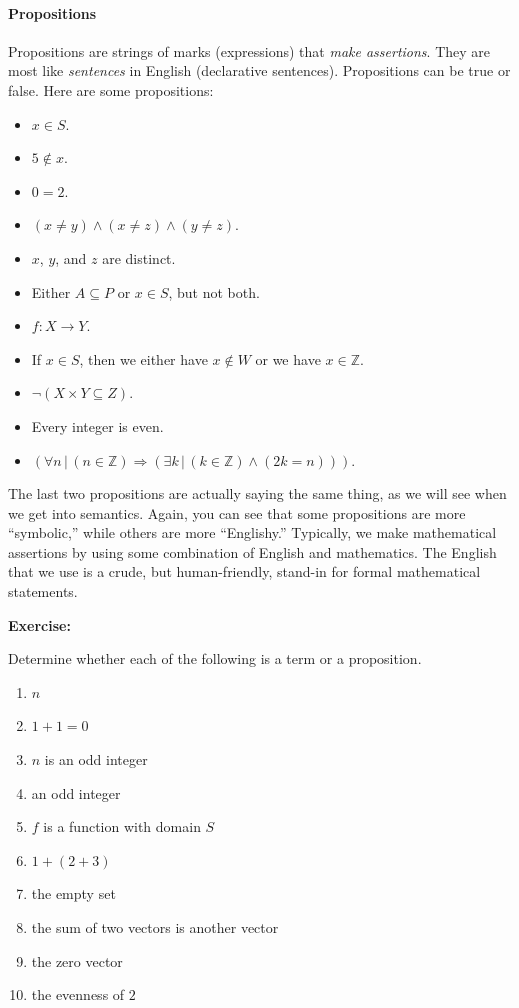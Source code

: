 \documentclass[12pt]{article}
\def\Z{\mathbb{Z}}
\newcommand{\AND}{\wedge}
\newcommand{\ARR}{\Rightarrow}
\newcommand{\ex}[1]{\textbf{Exercise:}\begin{adjustwidth}{2em}{}#1\end{adjustwidth}}
\begin{document}
\def\sp{\hspace{1em}}
\paragraph{Propositions}
Propositions are strings of marks (expressions) that \emph{make assertions}.
They are most like \emph{sentences} in English (declarative sentences).
Propositions can be true or false. 
Here are some propositions:
\begin{itemize}[label=\sp]
\item $x\in S$.
\item $5\notin x$.
\item $0=2$.
\item $(x\neq y) \AND (x\neq z) \AND (y\neq z)$.
\item $x$, $y$, and $z$ are distinct.
\item Either $A\subseteq P$ or $x\in S$, but not both.
\item $f:X\rightarrow Y$.
\item If $x\in S$, then we either have $x\notin W$ or we have $x\in\Z$.
\item $\neg(X\times Y \subseteq Z)$.
\item Every integer is even.
\item $(\forall n \, | \, (n\in\Z)\ARR (\exists k\,|\,(k\in\Z)\AND(2k=n)))$.
\end{itemize}
The last two propositions are actually saying the same thing, as we will see when we get into semantics.
Again, you can see that some propositions are more ``symbolic,'' while others are more ``Englishy.''
Typically, we make mathematical assertions by using some combination of English and mathematics.
The English that we use is a crude, but human-friendly, stand-in for formal mathematical statements.



\ex{
Determine whether each of the following is a term or a proposition.
\begin{enumerate}
\item $n$
\item $1+1=0$
\item $n$ is an odd integer
\item an odd integer
\item $f$ is a function with domain $S$
\item $1+(2+3)$
\item the empty set
\item the sum of two vectors is another vector
\item the zero vector
\item the evenness of $2$ %
\end{enumerate}
}
\end{document}
